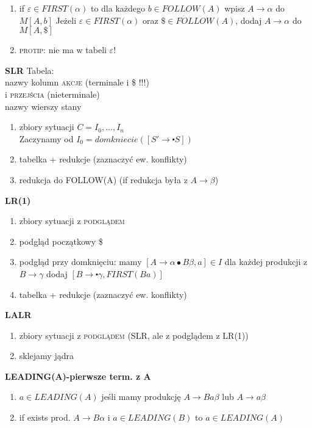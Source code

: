 \begin{multicols}{3}
\begin{enumerate}
      \item if $\varepsilon \in FIRST(\alpha)$ to dla każdego $b \in FOLLOW(A)$ wpisz $A\rightarrow \alpha$ do $M[A,b]$  Jeżeli $ \varepsilon  \in FIRST(\alpha)$ oraz $ \$ \in FOLLOW(A) $, dodaj $A \rightarrow \alpha $ do $M[A, \$]$ 
      \item \textsc{protip}: nie ma w tabeli $\varepsilon$!
    \end{enumerate}
    \textbf{SLR}
    Tabela:\\ nazwy kolumn \textsc{akcje} (terminale i \$ !!!) \\i \textsc{przejścia} (nieterminale) \\ nazwy wierszy stany 
    
    \begin{enumerate}
      \item zbiory sytuacji $C = I_0, \dots, I_n $ \\ Zaczynamy od $I_0 = domkniecie([S' \rightarrow \centerdot S])$
      \item tabelka + redukcje (zaznaczyć ew. konflikty)
      \item redukcja do FOLLOW(A) (if redukcja była z $A\rightarrow \beta$)
    \end{enumerate}
    \textbf{LR(1)}
    \begin{enumerate}
      \item zbiory sytuacji z \textsc{podglądem}
      \item podgląd początkowy \$
      \item podgląd przy domknięciu: mamy $[A\rightarrow \alpha \bullet B \beta , a] \in I$ 
          dla każdej produkcji z $B\rightarrow \gamma$ dodaj 
          $[B\rightarrow \centerdot \gamma ,FIRST(Ba)]$
      \item tabelka + redukcje (zaznaczyć ew. konflikty)
    \end{enumerate}	
    \textbf{LALR}
    \begin{enumerate}
      \item zbiory sytuacji z \textsc{podglądem} (SLR, ale z podglądem z LR(1))
      \item sklejamy jądra
    \end{enumerate}	
    \textbf{LEADING(A)-pierwsze term. z A}
    \begin{enumerate}
      \item	$a \in LEADING(A)$ jeśli mamy produkcję $A\rightarrow Ba\beta$ lub $A \rightarrow a \beta$ 
      \item if exists prod. $A\rightarrow B\alpha$ i $a \in LEADING(B)$ to $a \in LEADING(A)$

\end{enumerate}
\end{multicols}
